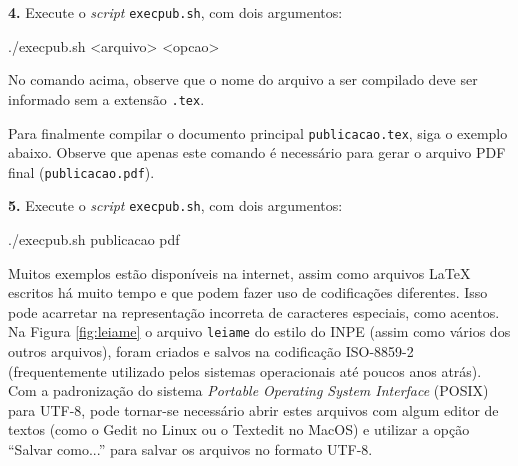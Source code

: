 %
%
%
%
%
%
%
%
%
%
%
%
%
%

\textbf{4.} Execute o \textit{script} {\tt execpub.sh}, com dois argumentos:
\begin{meucomando}
./execpub.sh <arquivo> <opcao>
\end{meucomando}

No comando acima, observe que o nome do arquivo a ser compilado deve ser informado sem a extensão {\tt .tex}.

Para finalmente compilar o documento principal {\tt publicacao.tex}, siga o exemplo abaixo. Observe que apenas este comando é necessário para gerar o arquivo PDF final ({\tt publicacao.pdf}).

\textbf{5.} Execute o \textit{script} {\tt execpub.sh}, com dois argumentos:
\begin{meucomando}
./execpub.sh publicacao pdf
\end{meucomando}

Muitos exemplos estão disponíveis na internet, assim como arquivos \LaTeX{} escritos há muito tempo e que podem fazer uso de codificações diferentes. Isso pode acarretar na representação incorreta de caracteres especiais, como acentos. Na Figura \ref{fig:leiame} o arquivo {\tt leiame} do estilo do INPE (assim como vários dos outros arquivos), foram criados e salvos na codificação ISO-8859-2 (frequentemente utilizado pelos sistemas operacionais até poucos anos atrás). Com a padronização do sistema \textit{Portable Operating System Interface} (POSIX) para UTF-8, pode tornar-se necessário abrir estes arquivos com algum editor de textos (como o Gedit no Linux ou o Textedit no MacOS) e utilizar a opção ``Salvar como...'' para salvar os arquivos no formato UTF-8. 

